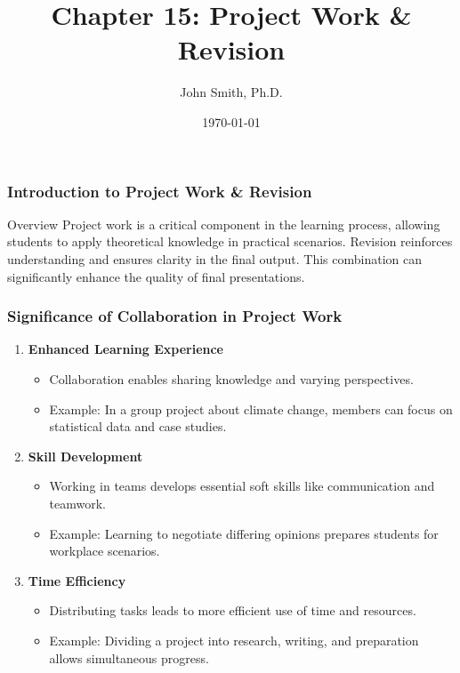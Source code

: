 \documentclass[aspectratio=169]{beamer}
\title[Project Work & Revision]{Chapter 15: Project Work \& Revision}
\author[J. Smith]{John Smith, Ph.D.}
\institute[University Name]{
  Department of Computer Science\\
  University Name\\
  \vspace{0.3cm}
  Email: email@university.edu\\
  Website: www.university.edu
}
\date{\today}
\begin{document}
\frame{\titlepage}

\begin{frame}[fragile]
  \frametitle{Introduction to Project Work \& Revision}
  \begin{block}{Overview}
    Project work is a critical component in the learning process, allowing students to apply theoretical knowledge in practical scenarios. 
    Revision reinforces understanding and ensures clarity in the final output.
    This combination can significantly enhance the quality of final presentations.
  \end{block}
\end{frame}

\begin{frame}[fragile]
  \frametitle{Significance of Collaboration in Project Work}
  \begin{enumerate}
    \item \textbf{Enhanced Learning Experience}
      \begin{itemize}
        \item Collaboration enables sharing knowledge and varying perspectives.
        \item Example: In a group project about climate change, members can focus on statistical data and case studies.
      \end{itemize}
  
    \item \textbf{Skill Development}
      \begin{itemize}
        \item Working in teams develops essential soft skills like communication and teamwork.
        \item Example: Learning to negotiate differing opinions prepares students for workplace scenarios.
      \end{itemize}
  
    \item \textbf{Time Efficiency}
      \begin{itemize}
        \item Distributing tasks leads to more efficient use of time and resources.
        \item Example: Dividing a project into research, writing, and preparation allows simultaneous progress.
      \end{itemize}
  \end{enumerate}
\end{frame}
\end{document}
